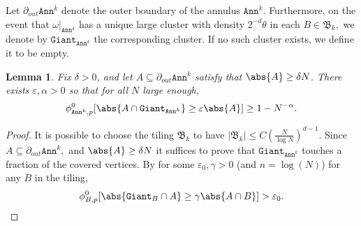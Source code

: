\documentclass[article,11pt,reqno]{amsart}
\newcommand{\Giant}{\mathtt{Giant}}
\newcommand{\ak}{\mathtt{Ann}^k}
\newtheorem{lemma}[theorem]{Lemma}
\begin{document}
\begin{appendix}
Let $\partial_{out} \ak$ denote the outer boundary of the annulus $\ak$. Furthermore, on the event that $\omega|_{\ak}$ has a unique large cluster with density $2^{-d}\theta$ in each $B\in \mathfrak{B}_k,$ we denote by $\mathtt{Giant}_{\ak}$ the corresponding cluster. If no such cluster exists, we define it to be empty. 
\begin{lemma}\label{lemma:fraction_connects_to_supergiant}
  Fix $\delta>0$, and let $A \subseteq \partial_{out} \ak$ satisfy that $\abs{A} \geq \delta N$. There exists $\varepsilon, \alpha >0$ so that for all $N$ large enough,
    $$
    \phi_{\ak,p}^0[\abs{A \cap \Giant_{\ak}} \geq \varepsilon \abs{A}] \geq 1-N^{-\alpha}. 
    $$
\end{lemma}
\begin{proof}   
It is possible to choose the tiling $\mathfrak{B}_k$ to have $|\mathfrak{B}_k|\leq C (\frac{N}{\log N})^{d-1} $. Since $A \subseteq \partial_{out} \ak,$ and $\abs{A} \geq \delta N$ it suffices to prove that $\Giant_{\ak}$ touches a fraction of the covered vertices. 
By   for some $\varepsilon_0, \gamma >0$  (and $n=\log(N)$) for any $B$ in the tiling, 
$$\phi_{B,p}^{0}[\abs{ \mathtt{Giant}_B \cap A} \geq \gamma \abs{A \cap B}] > \varepsilon_0. $$



\end{proof}
\end{appendix}
\end{document}
